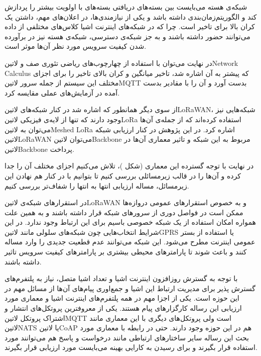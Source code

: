 شبکه‌ی هسته می‌بایست بین بسته‌های دریافتی بسته‌های با اولویت بیشتر را پردازش کند و الگوریتم‌زمان‌بندی داشته باشد و یکی از نیازمندی‌ها، در اعلان‌های مهم، داشتن یک کران بالا برای تاخیر است.
چرا که در شبکه‌های اینترنت اشیا کلاس‌های مختلفی از داده می‌توانند حضور داشته باشند و به جز شبکه‌ی دسترسی، شبکه‌ی هسته نیز در برآورده شدن کیفیت سرویس مورد نظر آن‌ها موثر است.

در نهایت می‌توان با استفاده از چهارچوب‌های ریاضی تئوری صف و ‌لاتین{Network Calculus} که پیشتر به آن اشاره شد،
تاخیر میانگین و کران بالای تاخیر را برای اجزای مختلف این سیستم از جمله
سرور ‌لاتین{MQTT} بدست آورد و آن را با مقادیر بدست آمده در آزمایش‌های عملی
مقایسه کرد.

از سوی دیگر همانطور که اشاره شد در کنار شبکه‌های ‌لاتین{LoRaWAN}، شبکه‌هایی نیز وجود دارند
که تنها از لایه‌ی فیزیکی ‌لاتین{LoRa} استفاده کرده‌اند که از جمله‌ی آن‌ها می‌توان به ‌لاتین{Meshed LoRa}
اشاره کرد. در این پژوهش در کنار ارزیابی شبکه ‌لاتین{LoRaWAN} می‌توان ‌لاتین{Backbone} مربوط
به این شبکه و تاثیر معماری آن‌ها در ‌لاتین{Backbone} پرداخت.

در نهایت با توجه گسترده این معماری (شکل )،
تلاش می‌کنیم اجزای مختلف آن را جدا کرده و آن‌ها را در قالب زیرمسائلی بررسی کنیم تا بتوانیم
با در کنار هم نهادن این زیرمسائل، مساله ارزیابی انتها به انتها را شفاف‌تر بررسی کنیم.


در استقرارهای شبکه‌ی ‌لاتین{LoRaWAN} و به خصوص استقرارهای عمومی دروازه‌ها ممکن است
در فواصل دوری از سرورهای شبکه قرار داشته باشند و به همین علت همواره امکان استفاده از یک شبکه خصوصی
باسیم برای این ارتباط وجود ندارد. در این شرایط انتخاب‌هایی چون شبکه‌های سلولی مانند ‌لاتین{GPRS}
یا استفاده از بستر عمومی اینترنت مطرح می‌شود. این شبکه می‌توانند عدم قطعیت جدیدی را وارد مساله کنند
و باعث شوند تا پارامترهای محیطی بیشتری بر پارامترهای کیفیت سرویس تاثیر داشته باشند.


با توجه به گسترش روزافزون اینترنت اشیا و تعداد اشیا متصل، نیاز به پلتفرم‌های گسترش پذیر برای مدیریت ارتباط این اشیا و جمع‌اوری پیام‌های آن‌ها
از مسائل مهم در این حوزه است. یکی از اجزا مهم در همه پلتفرم‌های اینترنت اشیا و معماری مورد ارزیابی این رساله کارگزار‌های پیام هستند. یکی از
معروفترین پروتکل‌های انتشار و اشتراک پروتکل ‌لاتین{MQTT} است ولی پروتکل‌های دیگری با این معماری مانند ‌لاتین{NATS} یا
‌لاتین{CoAP} هم در این حوزه وجود دارند. حتی در رابطه با معماری مورد بحث این رساله سایر ساختارهای ارتباطی مانند درخواست و پاسخ
هم می‌توانند مورد استفاده قرار بگیرند و برای رسیدن به کارایی بهینه می‌بایست مورد ارزیابی قرار بگیرند.

